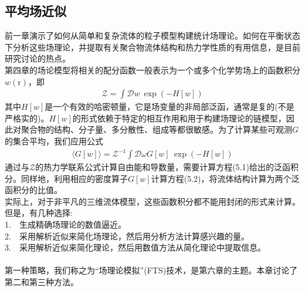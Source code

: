 \subsection{平均场近似}
前一章演示了如何从简单和复杂流体的粒子模型构建统计场理论。如何在平衡状态下分析这些场理论，并提取有关聚合物流体结构和热力学性质的有用信息，是目前研究讨论的热点。\\

第四章的场论模型将相关的配分函数一般表示为一个或多个化学势场上的函数积分$w(\mathrm{r})$，即\\
\begin{gather}
	\mathcal{Z}=\int \mathcal{D}w \ \exp(-H[w])
\end{gather}
其中$H[w]$是一个有效的哈密顿量，它是场变量的非局部泛函，通常是复的(不是严格实的)。$H[w]$的形式依赖于特定的相互作用和用于构建场理论的链模型，因此对聚合物的结构、分子量、多分散性、组成等都很敏感。为了计算某些可观测$G$的集合平均，我们应用公式\\
\begin{gather}
	\langle G[w]\rangle = \mathcal{Z}^{-1}\int \mathcal{D}\omega G[w]\ \exp(-H[w])
\end{gather}
通过与$\mathcal{Z}$的热力学联系公式计算自由能和导数量，需要计算方程(5.1)给出的泛函积分。同样地，利用相应的密度算子$G[w]$计算方程(5.2)，将流体结构计算为两个泛函积分的比值。\\

实际上，对于非平凡的三维流体模型，这些函数积分都不能用封闭的形式来计算。但是，有几种选择:\\

1.\ \ 生成精确场理论的数值逼近。\\

2.\ \ 采用解析近似来简化场理论，然后用分析方法计算感兴趣的量。\\

3.\ \ 采用解析近似来简化理论，然后用数值方法从简化理论中提取信息。\\
\\
第一种策略，我们称之为“场理论模拟”(FTS)技术，是第六章的主题。本章讨论了第二和第三种方法。\\

